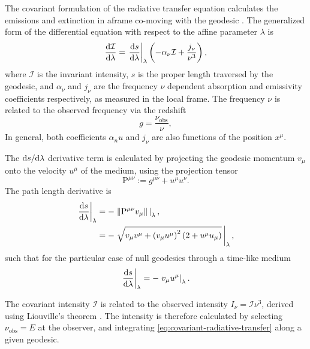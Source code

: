 The covariant formulation of the radiative transfer equation calculates the emissions and extinction in aframe co-moving with the geodesic \citep{fuerst_radiation_2004,younsi_general_2012}. The generalized form of the differential equation with respect to the affine parameter $\lambda$ is
\begin{equation}
    \label{eq:covariant-radiative-transfer}
    \frac{\text{d} \mathcal{I}}{\text{d} \lambda} = \left. \frac{\text{d} s}{\text{d} \lambda} \right\rvert_\lambda \left( -\alpha_\nu \mathcal{I} + \frac{j_\nu}{\nu^3} \right),
\end{equation}
where $\mathcal{I}$ is the invariant intensity, $s$ is the proper length traversed by the geodesic, and $\alpha_\nu$ and $j_\nu$ are the frequency $\nu$ dependent absorption and emissivity coefficients respectively, as measured in the local frame. The frequency $\nu$ is related to the observed frequency via the redshift
\begin{equation}
    g = \frac{\nu_\text{obs}}{\nu},
\end{equation}
In general, both coefficients $\alpha_nu$ and $j_\nu$ are also functions of the position $x^\mu$. 

The $\text{d} s / \text{d} \lambda$ derivative term is calculated by projecting the geodesic momentum $v_\mu$ onto the velocity $u^\mu$ of the medium, using the projection tensor
\begin{equation}
    \mathrm{P}^{\mu\nu} := g^{\mu\nu} + u^\mu u^\nu.
\end{equation}
The path length derivative is 
\begin{align}
    \left. \frac{\text{d} s}{\text{d} \lambda} \right\rvert_\lambda
    &= - \left. \left\lVert \mathrm{P}^{\mu\nu} v_\mu\right\rVert\, \right\rvert_\lambda,\\
    &= - \left. \sqrt{v_\mu v^\mu + \left(v_\mu u^\mu\right)^2 \left(2 + u^\mu u_\mu\right)} \, \right\rvert_\lambda,
\end{align}
such that for the particular case of null geodesics through a time-like medium
\begin{equation}
    \left. \frac{\text{d} s}{\text{d} \lambda} \right\rvert_\lambda = - \left. v_\mu u^\mu \right\rvert_\lambda.
\end{equation}

The covariant intensity $\mathcal{I}$ is related to the observed intensity $I_\nu = \mathcal{I} \nu^3$, derived using Liouville's theorem \citep{todo}. The intensity is therefore calculated by selecting $\nu_\text{obs} = E$ at the observer, and integrating \eqref{eq:covariant-radiative-transfer} along a given geodesic. 